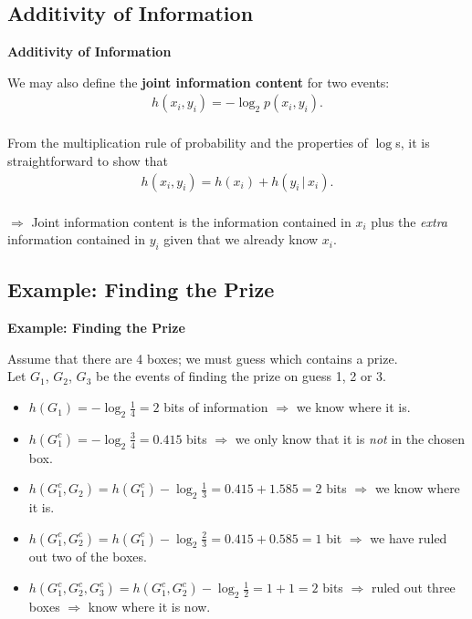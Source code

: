 \documentclass[compress]{beamer}        %
\makeatletter
\newcommand{\tcb}{\textcolor{beamer@blendedblue}}
\makeatother
\begin{document}
\subsection{Additivity of Information}
\begin{frame}{\bf \tcb{Additivity of Information}}

We may also define the {\bf joint information content} for two events:\\[-0.2cm]
\begin{align*}
h(x_i,y_i) = - \log_2 p(x_i,y_i).\\[0.2cm]
\end{align*}

From the multiplication rule of probability and the properties of $\log$s, it is straightforward to show that\\[-0.2cm]
\begin{align*}
\boxed{h(x_i,y_i) = h(x_i) + h(y_i\,|\,x_i)}.\\[-0.2cm]
\end{align*}

$\Rightarrow$ Joint information content is the information contained in $x_i$ plus the \emph{extra} information contained in $y_i$ given that we already know $x_i$.

\end{frame}





\subsection{Example: Finding the Prize}
\begin{frame}{\bf \tcb{Example: Finding the Prize}}

Assume that there are 4 boxes; we must guess which contains a prize.\\[0.3cm]

Let $G_1$, $G_2$, $G_3$ be the events of finding the prize on guess 1, 2 or 3.\\[0.3cm]
\begin{small}
\begin{itemize}\itemsep0.4cm
\item $h(G_1) = - \log_2 \frac{1}{4} = 2$ bits of information $\Rightarrow$ we know where it is.
\item $h(G_1^c) = - \log_2 \frac{3}{4} = 0.415$ bits $\Rightarrow$ we only know that it is \emph{not} in the chosen box.
\item $h(G_1^c,G_2) = h(G_1^c) - \log_2 \frac{1}{3} = 0.415+1.585 = 2$ bits $\Rightarrow$ we know where it is.
\item $h(G_1^c,G_2^c) = h(G_1^c) - \log_2 \frac{2}{3} = 0.415+0.585 = 1$ bit $\Rightarrow$ we have ruled out two of the boxes.
\item $h(G_1^c,G_2^c,G_3^c) = h(G_1^c,G_2^c) - \log_2 \frac{1}{2} = 1 + 1 = 2$ bits $\Rightarrow$ ruled out three boxes $\Rightarrow$ know where it is now.
\end{itemize}
\end{small}

\end{frame}
\end{document}
